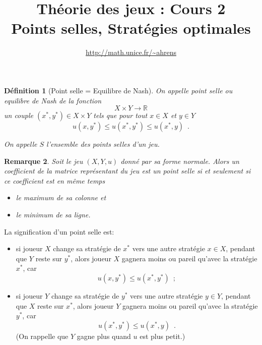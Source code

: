 \documentclass[11pt]{scrartcl}
\title{Th\'eorie des jeux : Cours 2\\ {\large Points selles, Strat\'egies optimales}}
\author{\url{http://math.unice.fr/~ahrens}}
\date{}
\theoremstyle{mydefinition}
\newtheorem{definition}{D\'efinition}
\newtheorem{rem}[definition]{Remarque}
\theoremstyle{myplain}
\newcommand{\R}{\ensuremath{\mathbb{R}}}
\begin{document}
 \maketitle

\begin{definition}[Point selle = Equilibre de Nash]
 On appelle  \emph{point selle} ou \emph{equilibre de Nash} de la fonction
 \[ X \times Y \to \R \]
 un couple $(x^*, y^*) \in X\times Y$ tels que pour tout $x\in X$ et $y \in Y$
 \begin{equation}  u(x,y^*) \leq u(x^*,y^*) \leq u(x^*,y) \enspace . \label{eq:point_selle}\end{equation}

 On appelle $S$ l'ensemble des points selles d'un jeu.
\end{definition}

\begin{rem}
 Soit le jeu $(X,Y,u)$  donn\'e par sa forme normale. Alors un coefficient de la matrice
 repr\'esentant du jeu est un point selle si et seulement si ce coefficient est
\emph{en m\^eme temps}
 \begin{itemize}
  \item le maximum de sa colonne \emph{et}
  \item le minimum de sa ligne.
 \end{itemize}

\end{rem}



La signification d'un point selle est:
\begin{itemize}
 \item si joueur $X$ change sa strat\'egie de $x^*$ vers une autre strat\'egie $x\in X$, pendant que 
  $Y$ reste sur $y^*$, alors joueur $X$ gagnera moins ou pareil qu'avec la strat\'egie $x^*$, car
     \[u(x,y^*) \leq u(x^*,y^*) \enspace ; \]
\item si joueur $Y$ change sa strat\'egie de $y^*$ vers une autre strat\'egie $y\in Y$, pendant que 
  $X$ reste sur $x^*$, alors joueur $Y$ gagnera moins ou pareil qu'avec la strat\'egie $y^*$, car
     \[u(x^*,y^*) \leq u(x^*,y) \enspace . \]
 (On rappelle que $Y$ gagne plus quand $u$ est plus petit.)
\end{itemize}
\end{document}
